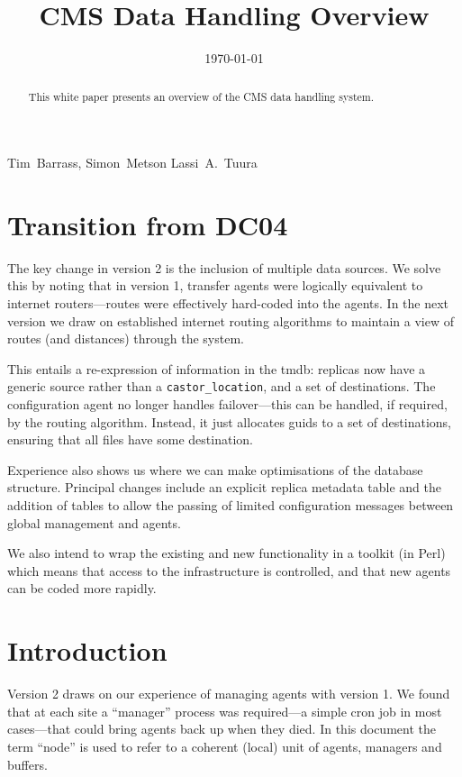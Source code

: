 \documentclass{cmspaper}
\begin{document}
\begin{titlepage}
  \whitepaper
  \date{\today}
  \title{CMS Data Handling Overview}

  \begin{Authlist}
    Tim~Barrass, Simon~Metson
    Lassi~A.~Tuura
  \end{Authlist}

  \begin{abstract}
    This white paper presents an overview of the CMS data handling system.
  \end{abstract} 

\end{titlepage}

\setcounter{page}{2}

\section{Transition from DC04}

The key change in version 2 is the inclusion of multiple data sources.
We solve this by noting that in version 1, transfer agents were
logically equivalent to internet routers---routes were effectively
hard-coded into the agents.  In the next version we draw on
established internet routing algorithms to maintain a view of routes
(and distances) through the system.

This entails a re-expression of information in the tmdb: replicas now
have a generic source rather than a \verb|castor_location|, and a set
of destinations.  The configuration agent no longer handles
failover---this can be handled, if required, by the routing algorithm.
Instead, it just allocates guids to a set of destinations, ensuring
that all files have some destination.

Experience also shows us where we can make optimisations of the
database structure.  Principal changes include an explicit replica
metadata table and the addition of tables to allow the passing of
limited configuration messages between global management and agents.

We also intend to wrap the existing and new functionality in a toolkit
(in Perl) which means that access to the infrastructure is controlled,
and that new agents can be coded more rapidly.

\section{Introduction}
Version 2 draws on our experience of managing agents with version 1.
We found that at each site a ``manager'' process was required---a
simple cron job in most cases---that could bring agents back up when
they died.  In this document the term ``node'' is used to refer to a
coherent (local) unit of agents, managers and buffers.
\end{document}

